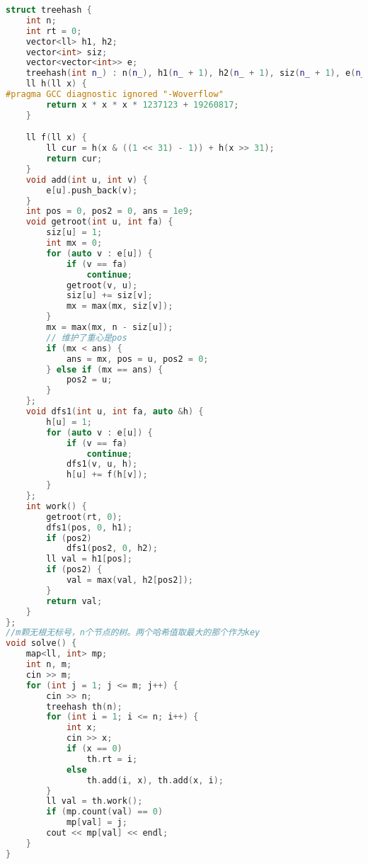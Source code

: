 \begin{lstlisting}[language=C++]
struct treehash {
    int n;
    int rt = 0;
    vector<ll> h1, h2;
    vector<int> siz;
    vector<vector<int>> e;
    treehash(int n_) : n(n_), h1(n_ + 1), h2(n_ + 1), siz(n_ + 1), e(n_ + 1) {}
    ll h(ll x) {
#pragma GCC diagnostic ignored "-Woverflow"
        return x * x * x * 1237123 + 19260817;
    }

    ll f(ll x) {
        ll cur = h(x & ((1 << 31) - 1)) + h(x >> 31);
        return cur;
    }
    void add(int u, int v) {
        e[u].push_back(v);
    }
    int pos = 0, pos2 = 0, ans = 1e9;
    void getroot(int u, int fa) {
        siz[u] = 1;
        int mx = 0;
        for (auto v : e[u]) {
            if (v == fa)
                continue;
            getroot(v, u);
            siz[u] += siz[v];
            mx = max(mx, siz[v]);
        }
        mx = max(mx, n - siz[u]);
        // 维护了重心是pos
        if (mx < ans) {
            ans = mx, pos = u, pos2 = 0;
        } else if (mx == ans) {
            pos2 = u;
        }
    };
    void dfs1(int u, int fa, auto &h) {
        h[u] = 1;
        for (auto v : e[u]) {
            if (v == fa)
                continue;
            dfs1(v, u, h);
            h[u] += f(h[v]);
        }
    };
    int work() {
        getroot(rt, 0);
        dfs1(pos, 0, h1);
        if (pos2)
            dfs1(pos2, 0, h2);
        ll val = h1[pos];
        if (pos2) {
            val = max(val, h2[pos2]);
        }
        return val;
    }
};
//m颗无根无标号，n个节点的树。两个哈希值取最大的那个作为key
void solve() {
    map<ll, int> mp;
    int n, m;
    cin >> m;
    for (int j = 1; j <= m; j++) {
        cin >> n;
        treehash th(n);
        for (int i = 1; i <= n; i++) {
            int x;
            cin >> x;
            if (x == 0)
                th.rt = i;
            else
                th.add(i, x), th.add(x, i);
        }
        ll val = th.work();
        if (mp.count(val) == 0)
            mp[val] = j;
        cout << mp[val] << endl;
    }
}
\end{lstlisting}
